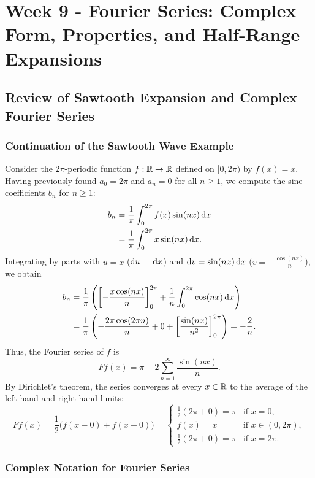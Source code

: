 \chapter{Week 9 - Fourier Series: Complex Form, Properties, and Half-Range Expansions}

\section{Review of Sawtooth Expansion and Complex Fourier Series}

\subsection{Continuation of the Sawtooth Wave Example}

Consider the $2\pi$-periodic function $f : \mathbb{R} \to \mathbb{R}$ defined on $[0, 2\pi)$ by $f(x) = x$. Having previously found $a_0 = 2\pi$ and $a_n = 0$ for all $n \ge 1$, we compute the sine coefficients $b_n$ for $n \ge 1$:
\begin{align*}
    b_n &= \frac{1}{\pi} \int_{0}^{2\pi} f(x) \sin(nx) \,\mathrm{d}x \\
        &= \frac{1}{\pi} \int_{0}^{2\pi} x \sin(nx) \,\mathrm{d}x.
\end{align*}
Integrating by parts with $u = x$ ($\mathrm{d} u = \,\mathrm{d}x$) and $\mathrm{d} v = \sin(nx)\,\mathrm{d}x$ ($v = -\frac{\cos(nx)}{n}$), we obtain
\begin{align*}
    b_n &= \frac{1}{\pi} \left( \left[ -\frac{x \cos(nx)}{n} \right]_{0}^{2\pi} + \frac{1}{n} \int_{0}^{2\pi} \cos(nx) \,\mathrm{d}x \right) \\
        &= \frac{1}{\pi} \left( -\frac{2\pi \cos(2\pi n)}{n} + 0 + \left[ \frac{\sin(nx)}{n^2} \right]_{0}^{2\pi} \right) = -\frac{2}{n}.
\end{align*}
Thus, the Fourier series of $f$ is
\[
    Ff(x) = \pi - 2 \sum_{n=1}^{\infty} \frac{\sin(nx)}{n}.
\]
By Dirichlet's theorem, the series converges at every $x \in \mathbb{R}$ to the average of the left-hand and right-hand limits:
\[
    Ff(x) = \frac{1}{2}\big(f(x-0) + f(x+0)\big) =
    \begin{cases}
        \frac{1}{2}(2\pi + 0) = \pi & \text{if } x = 0, \\
        f(x) = x & \text{if } x \in (0, 2\pi), \\
        \frac{1}{2}(2\pi + 0) = \pi & \text{if } x = 2\pi.
    \end{cases}
\]

\subsection{Complex Notation for Fourier Series}

